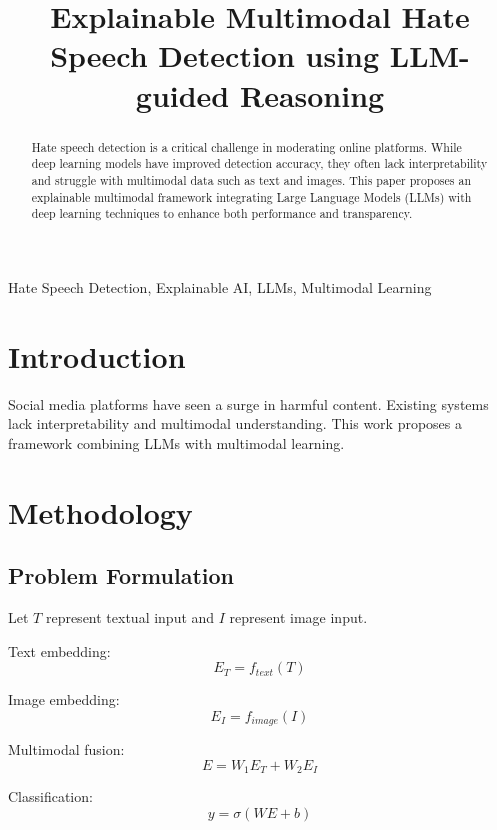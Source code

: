 \documentclass[conference]{IEEEtran}
\title{Explainable Multimodal Hate Speech Detection using LLM-guided Reasoning}
\author{\IEEEauthorblockN{Meghna Subramani}
\IEEEauthorblockA{B.E., CSE\\Undergraduate Student\\
Email: smegu.2706@gmail.com}}
\begin{document}
\maketitle

\begin{abstract}
Hate speech detection is a critical challenge in moderating online platforms. While deep learning models have improved detection accuracy, they often lack interpretability and struggle with multimodal data such as text and images. This paper proposes an explainable multimodal framework integrating Large Language Models (LLMs) with deep learning techniques to enhance both performance and transparency.
\end{abstract}

\begin{IEEEkeywords}
Hate Speech Detection, Explainable AI, LLMs, Multimodal Learning
\end{IEEEkeywords}

\section{Introduction}
Social media platforms have seen a surge in harmful content. Existing systems lack interpretability and multimodal understanding. This work proposes a framework combining LLMs with multimodal learning.

\section{Methodology}

\subsection{Problem Formulation}
Let $T$ represent textual input and $I$ represent image input.

Text embedding:
\begin{equation}
E_T = f_{text}(T)
\end{equation}

Image embedding:
\begin{equation}
E_I = f_{image}(I)
\end{equation}

Multimodal fusion:
\begin{equation}
E = W_1 E_T + W_2 E_I
\end{equation}

Classification:
\begin{equation}
y = \sigma(WE + b)
\end{equation}
\end{document}
